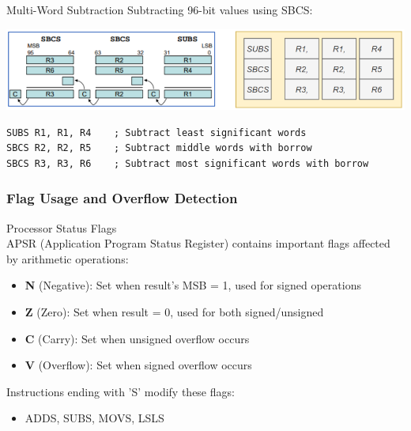 \begin{example2}{Multi-Word Subtraction}
Subtracting 96-bit values using SBCS:

\includegraphics[width=\linewidth]{images/multiwordsub.png}

\begin{lstlisting}[language=armasm, style=basesmol]
SUBS R1, R1, R4    ; Subtract least significant words
SBCS R2, R2, R5    ; Subtract middle words with borrow
SBCS R3, R3, R6    ; Subtract most significant words with borrow
\end{lstlisting}
\end{example2}

\subsubsection{Flag Usage and Overflow Detection}

\begin{concept}{Processor Status Flags}\\
APSR (Application Program Status Register) contains important flags affected by arithmetic operations:
\begin{itemize}
  \item \textbf{N} (Negative): Set when result's MSB = 1, used for signed operations
  \item \textbf{Z} (Zero): Set when result = 0, used for both signed/unsigned
  \item \textbf{C} (Carry): Set when unsigned overflow occurs
  \item \textbf{V} (Overflow): Set when signed overflow occurs
\end{itemize}

Instructions ending with 'S' modify these flags:
\begin{itemize}
  \item ADDS, SUBS, MOVS, LSLS
\end{itemize}
\end{concept}

